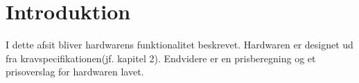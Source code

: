 \section{Introduktion}
I dette afsit bliver hardwarens funktionalitet beskrevet. Hardwaren er designet ud fra kravspecifikationen(jf. kapitel 2). Endvidere er en prisberegning og et prisoverslag for hardwaren lavet.
